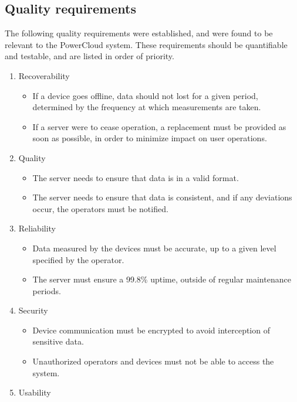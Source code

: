 \documentclass{article}
\begin{document}
	\newpage

	\subsection{Quality requirements}
	
	The following quality requirements were established, and were found 
	to be relevant to the PowerCloud system. These requirements should be 
	quantifiable and testable, and are listed in order of priority.
	
	\begin{enumerate}
		\item Recoverability
			\begin{itemize}
				\item If a device goes offline, data should not lost for 
				a given period, determined by the frequency at which 
				measurements are taken.
				\item If a server were to cease operation, a replacement 
				must be provided as soon as possible, in order to 
				minimize impact on user operations.
			\end{itemize}
		\item Quality
			\begin{itemize}
				\item The server needs to ensure that data is in a valid 
				format.
				\item The server needs to ensure that data is consistent, 
				and if any deviations occur, the operators must be 
				notified.
			\end{itemize}
		\item Reliability
			\begin{itemize}
				\item Data measured by the devices must be accurate, up 
				to a given level specified by the operator.
				\item The server must ensure a 99.8\% uptime, outside of 
				regular maintenance periods.
			\end{itemize}
		\item Security
			\begin{itemize}
				\item Device communication must be encrypted to avoid 
				interception of sensitive data.
				\item Unauthorized operators and devices must not be able 
				to access the system.
			\end{itemize}
		\item Usability
			\begin{itemize}

\end{itemize}
\end{enumerate}
\end{document}
